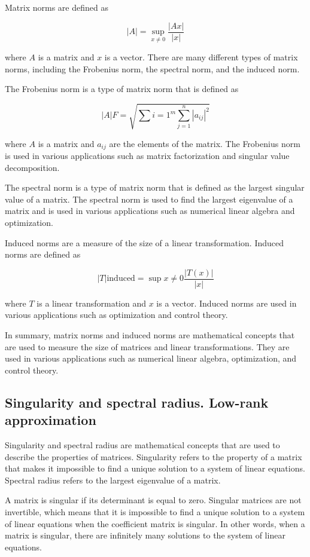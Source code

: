 \documentclass[12pt, a4paper, oneside]{article}
\begin{document}
Matrix norms are defined as

$$\left|A\right| = \sup\limits_{x\neq0} \frac{\left|Ax\right|}{\left|x\right|}$$

where $A$ is a matrix and $x$ is a vector. There are many different types of matrix norms, including the Frobenius norm, the spectral norm, and the induced norm.

The Frobenius norm is a type of matrix norm that is defined as

$$\left|A\right|F = \sqrt{\sum\limits{i=1}^{m}\sum\limits_{j=1}^{n} |a_{ij}|^2}$$

where $A$ is a matrix and $a_{ij}$ are the elements of the matrix. The Frobenius norm is used in various applications such as matrix factorization and singular value decomposition.

The spectral norm is a type of matrix norm that is defined as the largest singular value of a matrix. The spectral norm is used to find the largest eigenvalue of a matrix and is used in various applications such as numerical linear algebra and optimization.

Induced norms are a measure of the size of a linear transformation. Induced norms are defined as

$$\left|T\right|{\text{induced}} = \sup\limits{x\neq0} \frac{\left|T(x)\right|}{\left|x\right|}$$

where $T$ is a linear transformation and $x$ is a vector. Induced norms are used in various applications such as optimization and control theory.

In summary, matrix norms and induced norms are mathematical concepts that are used to measure the size of matrices and linear transformations. They are used in various applications such as numerical linear algebra, optimization, and control theory.





\subsection{ Singularity and spectral radius. Low-rank approximation}
Singularity and spectral radius are mathematical concepts that are used to describe the properties of matrices. Singularity refers to the property of a matrix that makes it impossible to find a unique solution to a system of linear equations. Spectral radius refers to the largest eigenvalue of a matrix.

A matrix is singular if its determinant is equal to zero. Singular matrices are not invertible, which means that it is impossible to find a unique solution to a system of linear equations when the coefficient matrix is singular. In other words, when a matrix is singular, there are infinitely many solutions to the system of linear equations.
\end{document}
